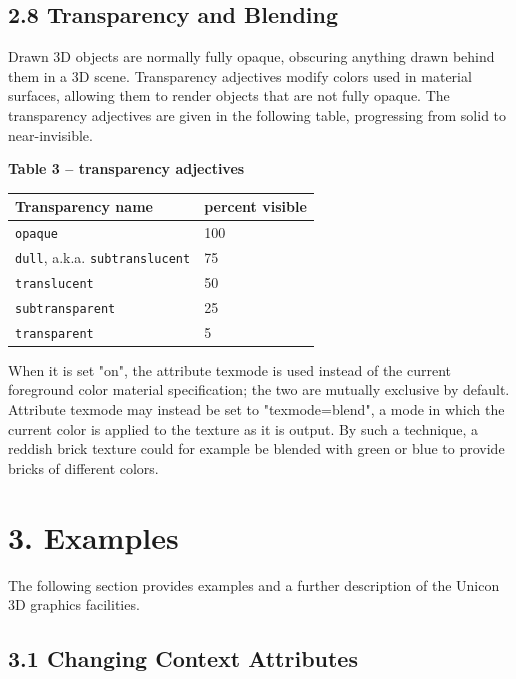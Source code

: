 \documentclass[letterpaper]{article}
\begin{document}
\subsection[2.8 Transparency and Blending]{2.8 Transparency and Blending}

Drawn 3D objects are normally fully opaque, obscuring anything drawn
behind them in a 3D scene. Transparency adjectives modify colors used
in material surfaces, allowing them to render objects that are not fully
opaque. The transparency adjectives are given in the following table,
progressing from solid to near-invisible.

\bigskip

{\centering\bfseries
Table 3 -- transparency adjectives
\par}

\begin{center}
\begin{tabular}{|l | l|}\hline
Transparency name & percent visible \\\hline
\texttt{opaque} & 100 \\
\texttt{dull}, a.k.a. \texttt{subtranslucent} & 75 \\
\texttt{translucent} & 50 \\
\texttt{subtransparent} & 25 \\
\texttt{transparent} & 5 \\\hline
\end{tabular}

\end{center}

\bigskip



When it is set \textsf{"on"}, the attribute \textsf{texmode} is used instead
of the current foreground color material specification; the two are
mutually exclusive by default.  Attribute \textsf{texmode} may instead be set
to \textsf{"texmode=blend"}, a mode in which the current color is
applied to the texture as it is output. By such a technique, a reddish
brick texture could for example be blended with green or blue to provide
bricks of different colors.


\section[3. Examples]{3. Examples}

The following section provides examples and a further description of
the Unicon 3D graphics facilities.

\subsection[3.1 Changing Context Attributes]{3.1 Changing Context Attributes}
\end{document}
